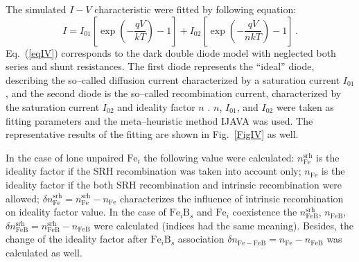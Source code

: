 \documentclass[12pt]{article}
\begin{document}
The simulated $I-V$ characteristic were fitted by following equation:
\begin{equation}
\label{eqIV}
    I=I_{01}\left[\exp\left(-\frac{qV}{kT}\right)-1\right]+ I_{02}\left[\exp\left(-\frac{qV}{nkT}\right)-1\right]\,.
\end{equation}
Eq.~(\ref{eqIV}) corresponds to the dark double diode model with neglected both series and shunt resistances.
The first diode represents the ``ideal'' diode, describing the so--called diffusion current characterized by a saturation current $I_{01}$,
and the second diode is the so--called recombination current, characterized by the saturation current $I_{02}$ and ideality factor $n$ \cite{Breitenstein2013}.
$n$, $I_{01}$, and $I_{02}$ were taken as fitting parameters and the meta--heuristic method IJAVA \cite{IJAVA} was used.
The representative results of the fitting are shown in Fig.~\ref{FigIV} as well.


In the case of lone unpaired $\mathrm{Fe}_i$ the following value were calculated:
$n_\mathrm{Fe}^\mathrm{srh}$ is the ideality factor if the SRH recombination was taken into account only;
$n_\mathrm{Fe}$ is the ideality factor if the both SRH recombination and intrinsic recombination were allowed;
$\delta n_\mathrm{Fe}^\mathrm{srh}=n_\mathrm{Fe}^\mathrm{srh}-n_\mathrm{Fe}$ characterizes the influence of intrinsic recombination on ideality factor value.
In the case of $\mathrm{Fe}_i\mathrm{B}_s$ and $\mathrm{Fe}_i$ coexistence the
$n_\mathrm{FeB}^\mathrm{srh}$, $n_\mathrm{FeB}$, $\delta n_\mathrm{FeB}^\mathrm{srh}=n_\mathrm{FeB}^\mathrm{srh}-n_\mathrm{FeB}$ were calculated (indices had the same meaning).
Besides, the change of the ideality factor after $\mathrm{Fe}_i\mathrm{B}_s$ association $\delta n_\mathrm{Fe-FeB}=n_\mathrm{Fe}-n_\mathrm{FeB}$ was calculated as well.






\end{document}
